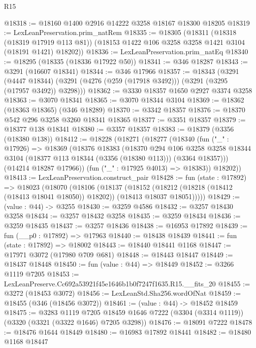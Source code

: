 \begin{lexlean}{R15}
\begin{coremodule}
@18318 := @18160 @1400 @2916 @14222 @3258 @18167 @18300 @18205
@18319 := LexLeanPreservation.prim_natRem
@18335 := @18305
    (@18311
      (@18318 (@18319 @17919 @113 @81))
      (@18153 @1422 @106 @3258 @3258 @1421 @3104 (@18191 @1421) @18202))
@18336 := LexLeanPreservation.prim_natEq
@18340 := @18295 (@18335 (@18336 @17922 @50))
@18341 := @346 @18287
@18343 := @3291 (@16607 @18341)
@18344 := @346 @17966
@18357 := @18343
    (@3291
      (@4447 @18344)
      (@3291 (@4276 (@259 (@17918 @3492))) (@3291 (@3295 (@17957 @3492)) @3298)))
@18362 := @3330 @18357 @1650 @2927 @3374 @3258
@18363 := @3070 @18341
@18365 := @3070 @18344 @3104
@18369 := @18362 (@18363 @18365) (@346 @18289)
@18370 := @3342 @18357
@18376 := @18370 @542 @296 @3258 @3260 @18341 @18365
@18377 := @3351 @18357
@18379 := @18377 @138 @18341
@18380 := @3357 @18357
@18383 := @18379 (@3356 (@18380 @138))
@18412 := @18228
    (@18271
      (@18277
        (@18340
          (fun ("_" : @17926) =>
          @18369
            (@18376
              @18383
              (@18370
                @294
                @106
                @3258
                @3258
                @18344
                @3104
                (@18377 @113 @18344 (@3356 (@18380 @113)))
                (@3364 @18357)))
            (@14214 @18287 @17966))
          (fun ("_" : @17925 @4013) => @18383))
        @18202))
@18413 := LexLeanPreservation.construct_pair
@18428 := fun (state : @17892) =>
  @18023
    (@18070
      (@18106
        (@18137
          (@18152
            (@18212 (@18218 (@18412 (@18413 @18041 @18050)) @18202))
            (@18413 @18037 @18051)))))
@18429 := (value : @44) -> @3255
@18430 := @3259 @4586
@18432 := @3257 @18430 @3258
@18434 := @3257 @18432 @3258
@18435 := @3259 @18434
@18436 := @3259 @18435
@18437 := @3257 @18436
@18438 := @16953 @17892
@18439 := fun (__p0 : @17892) => @17963
@18440 := @18438 @18439
@18441 := fun (state : @17892) => @18002
@18443 := @18440 @18441 @1168
@18447 := @17971 @3072 (@17980 @709 @681)
@18448 := @18443 @18447
@18449 := @18437 @18448
@18450 := fun (value : @44) => @18449
@18452 := @3266 @1119 @7205
@18453 := LexLeanPreserve.Cc692a53921f45e1646b1b0f7247f1635.R15.__fits_20
@18455 := @3272 (@18453 @3072)
@18456 := LexLeanStd.Sha256.wordOfNat
@18459 := @18455 (@346 (@18456 @3072))
@18461 := (value : @44) -> @18452 @18459
@18475 := @3283
    @1119
    @7205
    @18459
    @1646
    @7222
    (@3304 (@3314 @1119))
    (@3320 (@3321 (@3322 @1646) @7205 @3298))
@18476 := @18091 @7222
@18478 := @18476 @1644 @18449
@18480 := @16983 @17892 @18441
@18482 := @18480 @1168 @18447

\end{coremodule}
\end{lexlean}
